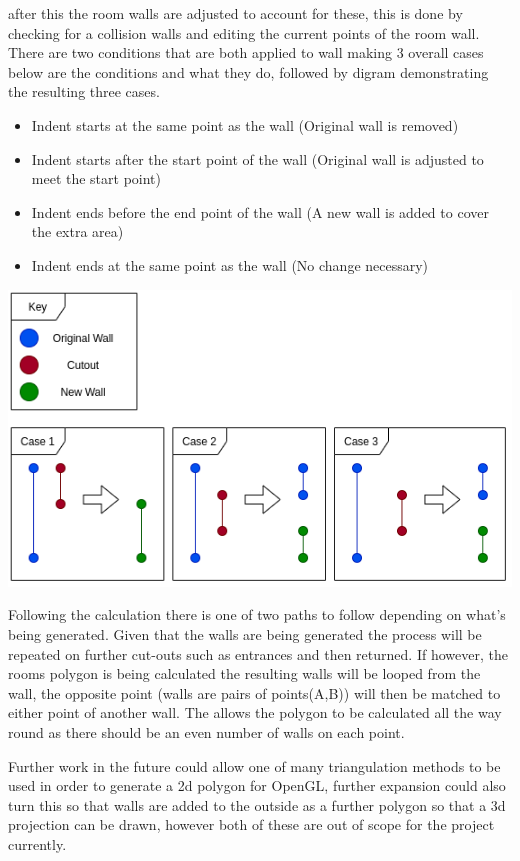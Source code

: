 after this the room walls are adjusted to account for these, this is done by checking for a collision walls and editing the current points of the room wall. There are two conditions that are both applied to wall making 3 overall cases below are the conditions and what they do, followed by digram demonstrating the resulting three cases.
\begin{itemize}
	\item Indent starts at the same point as the wall (Original wall is removed)
	\item Indent starts after the start point of the wall (Original wall is adjusted to meet the start point)
	\item Indent ends before the end point of the wall (A new wall is added to cover the extra area)
	\item Indent ends at the same point as the wall (No change necessary)	
\end{itemize}
\begin{center}
	\includegraphics[width=\linewidth]{images/implementation/wallconditions.png}
\end{center}

Following the calculation there is one of two paths to follow depending on what's being generated. Given that the walls are being generated the process will be repeated on further cut-outs such as entrances and then returned. If however, the rooms polygon is being calculated the resulting walls will be looped from the wall, the opposite point (walls are pairs of points(A,B)) will then be matched to either point of another wall. The allows the polygon to be calculated all the way round as there should be an even number of walls on each point.

Further work in the future could allow one of many triangulation methods to be used in order to generate a 2d polygon for OpenGL, further expansion could also turn this so that walls are added to the outside as a further polygon so that a 3d projection can be drawn, however both of these are out of scope for the project currently.


